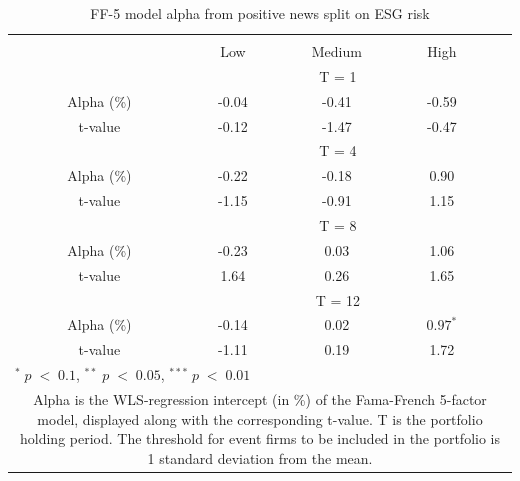 \setlength{\tabcolsep}{15pt}
\begin{table}[H]
\small
\centering
\caption{FF-5 model alpha from positive news split on ESG risk} 
\begin{tabular}{ccccccc}
\hline \hline \\  
 &     &  &    Low  &  Medium  &  High  &  \\ \cline{4-6} 
& & & \multicolumn{3}{c}{ T = 1} & \\ \cline{2-6}
& Alpha (\%)  &  & -0.04  & -0.41  & -0.59 &  \\
& t-value &  & -0.12 & -1.47  & -0.47 & \\
& & & \multicolumn{3}{c}{ T = 4} & \\ \cline{2-6}
& Alpha (\%)  &  & -0.22  & -0.18  &  0.90 & \\
& t-value &  & -1.15 & -0.91  & 1.15 & \\
& & & \multicolumn{3}{c}{ T = 8} & \\ \cline{2-6}
& Alpha (\%)  &  & -0.23   & 0.03  & 1.06 &  \\
& t-value &  & 1.64  & 0.26 & 1.65 & \\
&  & & \multicolumn{3}{c}{ T = 12} & \\ \cline{2-6}
& Alpha (\%)  &  & -0.14  & 0.02  & $0.97^{*}$ &  \\
& t-value &  & -1.11  & 0.19 & 1.72 & \\
\hline \hline
 \multicolumn{7}{l}{ \footnotesize $^* \; p\; <\; 0.1$, $ ^{**} \; p\; <\; 0.05$, $ ^{***} \; p\; <\; 0.01$  } \\
 \multicolumn{7}{p{11.5cm}}{ \footnotesize Alpha is the WLS-regression intercept (in \%) of the Fama-French 5-factor model, displayed along with the corresponding t-value. T is the portfolio holding period. The threshold for event firms to be included in the portfolio is 1 standard deviation from the mean.}  \\ 
\end{tabular}
\label{tab: FF5_pos_ESG}
\end{table}